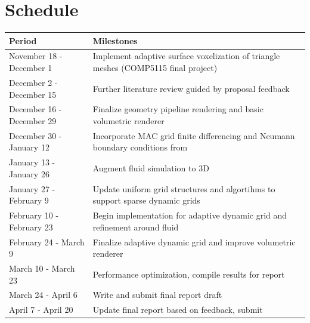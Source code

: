 \documentclass[a4paper, 11pt, titlepage]{article}
\begin{document}
\section{Schedule}
\begin{tabularx}{\textwidth}{|X|X|}
\hline
\textbf{Period} & \textbf{Milestones} \\
\hline
November 18 - December 1 & \multicolumn{1}{X|}{
    Implement adaptive surface voxelization of triangle meshes (COMP5115 final project)
}\\
\hline
December 2 - December 15 & \multicolumn{1}{X|}{
    Further literature review guided by proposal feedback
}\\
\hline
December 16 - December 29 & \multicolumn{1}{X|}{
    Finalize geometry pipeline rendering and basic volumetric renderer
}\\
\hline
December 30 - January 12 & \multicolumn{1}{X|}{
    Incorporate MAC grid finite differencing and Neumann boundary conditions
    from \cite{bridsonbook}
}\\
\hline
January 13 - January 26 & \multicolumn{1}{X|}{
    Augment fluid simulation to 3D
}\\
\hline
January 27 - February 9 & \multicolumn{1}{X|}{
    Update uniform grid structures and algortihms to support sparse dynamic grids
}\\
\hline
February 10 - February 23 & \multicolumn{1}{X|}{
    Begin implementation for adaptive dynamic grid and refinement around fluid
}\\
\hline
February 24 - March 9 & \multicolumn{1}{X|}{
    Finalize adaptive dynamic grid and improve volumetric renderer
}\\
\hline
March 10 - March 23 & \multicolumn{1}{X|}{
    Performance optimization, compile results for report
}\\
\hline
March 24 - April 6 & \multicolumn{1}{X|}{
    Write and submit final report draft
}\\
\hline
April 7 - April 20 & \multicolumn{1}{X|}{
    Update final report based on feedback, submit
}\\
\hline
\end{tabularx}
\pagebreak
\printbibliography
\end{document}
